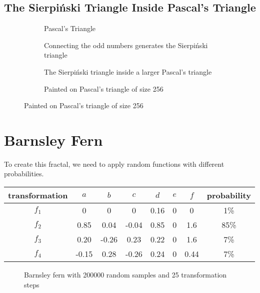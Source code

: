 \documentclass[12pt,a4paper]{article}
\newcommand{\figpath}{../fig}
\begin{document}
    \subsection{The Sierpiński Triangle Inside Pascal's Triangle}
    \begin{figure}
        \centering
        \begin{subfigure}{0.45\linewidth}
            \centering
            \caption{Pascal's Triangle}
        \end{subfigure}
        \begin{subfigure}{0.45\linewidth}
            \centering
            \caption{Connecting the odd numbers generates the Sierpiński triangle}
        \end{subfigure}
        \begin{subfigure}{0.45\linewidth}
            \centering
            \caption{The Sierpiński triangle inside a larger Pascal's triangle}
        \end{subfigure}
        \begin{subfigure}{0.45\linewidth}
            \centering
            \caption{Painted on Pascal's triangle of size 256}
        \end{subfigure}
    \end{figure}
    \FloatBarrier
    \restoregeometry
    \section{Barnsley Fern}
    To create this fractal, we need to apply random functions with different probabilities.
    \begin{table}
        \centering
        \begin{tabular}{|c|c|c|c|c|c|c|c|}
            \hline
            transformation & $a$ & $b$ & $c$ & $d$ & $e$ & $f$ & probability \\
            \hline
            $f_1$ & 0 & 0 & 0 & 0.16 & 0 & 0 & 1\% \\
            \hline
            $f_2$ & 0.85 & 0.04 & -0.04 & 0.85 & 0 & 1.6 & 85\% \\
            \hline
            $f_3$ & 0.20 & -0.26 & 0.23 & 0.22 & 0 & 1.6 & 7\% \\
            \hline
            $f_4$ & -0.15 & 0.28 & -0.26 & 0.24 & 0 & 0.44 & 7\% \\
            \hline
        \end{tabular}
    \end{table}
    \thispagestyle{empty}
    \begin{figure}
        \centering
        \caption{Barnsley fern with 200000 random samples and 25 transformation steps}
    \end{figure}
\end{document}

